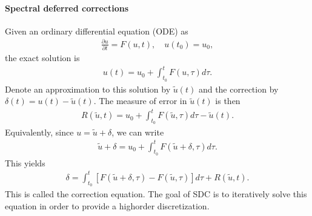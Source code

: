 \documentclass[letterpaper,10pt,english]{sphinxmanual}
\begin{document}
\paragraph{Spectral deferred corrections}
\label{\detokenize{MinimalPlasmaModel:spectral-deferred-corrections}}
Given an ordinary differential equation (ODE) as
\begin{equation*}
\begin{split}\frac{\partial u}{\partial t} = F(u,t), \quad u(t_0) = u_0,\end{split}
\end{equation*}
the exact solution is
\begin{equation*}
\begin{split}u(t) = u_0 + \int_{t_0}^tF\left(u,\tau\right)d\tau.\end{split}
\end{equation*}
Denote an approximation to this solution by \(\widetilde{u}(t)\) and the correction by \(\delta(t) = u(t) - \widetilde{u}(t)\). The measure of error in \(\widetilde{u}(t)\) is then
\begin{equation*}
\begin{split}R(\widetilde{u}, t) = u_0 + \int_{t_0}^tF(\widetilde{u}, \tau)d\tau - \widetilde{u}(t).\end{split}
\end{equation*}
Equivalently, since \(u = \widetilde{u} + \delta\), we can write
\begin{equation*}
\begin{split}\widetilde{u} + \delta = u_0 + \int_{t_0}^t F\left(\widetilde{u}+\delta, \tau\right)d\tau.\end{split}
\end{equation*}
This yields
\begin{equation*}
\begin{split}\delta = \int_{t_0}^t\left[F\left(\widetilde{u}+\delta, \tau\right) - F\left(\widetilde{u}, \tau\right)\right]d\tau + R\left(\widetilde{u},t\right).\end{split}
\end{equation*}
This is called the correction equation. The goal of SDC is to iteratively solve this equation in order to provide a high\sphinxhyphen{}order discretization.
\end{document}
